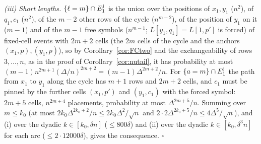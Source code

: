 \emph{(iii) Short lengths.}  $\{\ell=m\}\cap E_1^{\rm j}$ is the
union over the positions of $x_1,y_1$ ($n^2$), of $q_1,c_1$ ($n^2$),
of the $m-2$ other rows of the cycle ($n^{m-2}$), of the position of
$y_1$ on it ($m-1$) and of the $m-1$ free symbols ($n^{m-1}$;
$L[y_1,q_1]=L[1,p']$ is forced) of fixed-cell events with $2m+2$ cells
(the $2m$ cells of the cycle and the anchors $(x_1,p),(y_1,p)$), so by
Corollary~\ref{cor:FCtwo} and the exchangeability of rows
$3,\dots,n$, as in the proof of Corollary~\ref{cor:nutail}, it has
probability at most $(m-1)n^{2m+1}(\Delta/n)^{2m+2}=(m-1)\Delta^{2m+2}/n$.  For $\{a=m\}\cap E_1^{\rm j}$
the path from $x_1$ to $y_1$ along the cycle has $m+1$ rows and
$2m+2$ cells, and $c_1$ must be pinned by the further cells
$(x_1,p')$ and $(y_1,c_1)$ with the forced symbol: $2m+5$ cells,
$n^{2m+4}$ placements, probability at most $\Delta^{2m+5}/n$.  Summing
over $m\le k_0$ (at most $2k_0\Delta^{2k_0+2}/n\le2k_0\Delta^2/\sqrt n$ and
$2\cdot2\Delta^{2k_0+5}/n\le4\Delta^5/\sqrt n$), and (i) over the
dyadic $k\in[k_0,\delta n]$ ($\le800\delta$) and (ii) over the dyadic
$k\in[k_0,\delta^3n]$ for each arc ($\le2\cdot12000\delta$), gives the
consequence.  $\square$

